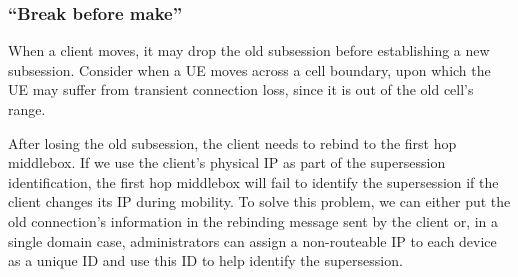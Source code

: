\subsubsection{``Break before make''}
When a client moves, it may drop the old subsession before establishing a new subsession. Consider when a UE moves across a cell boundary, upon which the UE may suffer from transient connection loss, since it is out of the old cell's range. 

After losing the old subsession, the client needs to rebind to the first hop middlebox. If we use the client's physical IP as part of the supersession identification, the first hop middlebox will fail to identify the supersession if the client changes its IP during mobility. To solve this problem, we can either put the old connection's information in the rebinding message sent by the client or, in a single domain case, administrators can assign a non-routeable IP to each device as a unique ID and use this ID to help identify the supersession. 
 
